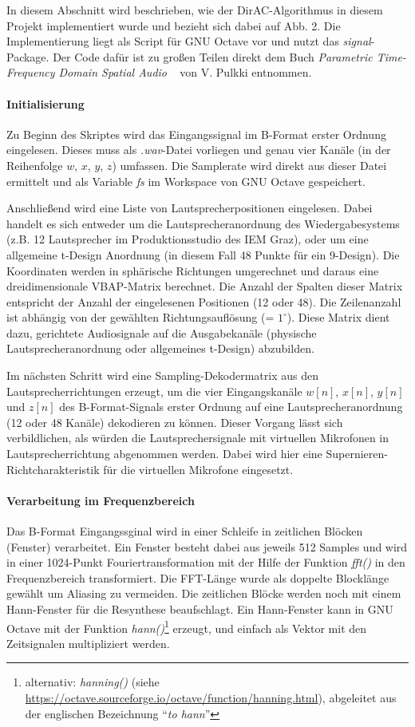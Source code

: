 In diesem Abschnitt wird beschrieben, wie der DirAC-Algorithmus in diesem Projekt implementiert wurde und bezieht sich dabei auf Abb. 2. Die Implementierung liegt als Script für GNU Octave vor und nutzt das \textit{signal}-Package. Der Code dafür ist zu großen Teilen direkt dem Buch \textit{Parametric Time-Frequency Domain Spatial Audio} ~\cite{spatial-book} von V. Pulkki entnommen.

\paragraph{Initialisierung}
Zu Beginn des Skriptes wird das Eingangssignal im B-Format erster Ordnung eingelesen. Dieses muss als \textit{.wav}-Datei vorliegen und genau vier Kanäle (in der Reihenfolge $w$, $x$, $y$, $z$) umfassen. Die Samplerate wird direkt aus dieser Datei ermittelt und als Variable \textit{fs} im Workspace von GNU Octave gespeichert.

Anschließend wird eine Liste von Lautsprecherpositionen eingelesen. Dabei handelt es sich entweder um die Lautsprecheranordnung des Wiedergabesystems (z.B. 12 Lautsprecher im Produktionsstudio des IEM Graz), oder um eine allgemeine t-Design Anordnung (in diesem Fall 48 Punkte für ein 9-Design). Die Koordinaten werden in sphärische Richtungen umgerechnet und daraus eine dreidimensionale VBAP-Matrix berechnet. Die Anzahl der Spalten dieser Matrix entspricht der Anzahl der eingelesenen Positionen (12 oder 48). Die Zeilenanzahl ist abhängig von der gewählten Richtungsauflösung (= $1^{\circ}$). Diese Matrix dient dazu, gerichtete Audiosignale auf die Ausgabekanäle (physische Lautsprecheranordnung oder allgemeines t-Design) abzubilden.

Im nächsten Schritt wird eine Sampling-Dekodermatrix \cite{ambi-book} aus den Lautsprecherrichtungen erzeugt, um die vier Eingangskanäle $w[n]$, $x[n]$, $y[n]$ und $z[n]$ des B-Format-Signals erster Ordnung auf eine Lautsprecheranordnung (12 oder 48 Kanäle) dekodieren zu können.
Dieser Vorgang lässt sich verbildlichen, als würden die Lautsprechersignale mit virtuellen Mikrofonen in Lautsprecherrichtung abgenommen werden. Dabei wird hier eine Supernieren-Richtcharakteristik für die virtuellen Mikrofone eingesetzt.

\paragraph{Verarbeitung im Frequenzbereich}
Das B-Format Eingangssginal wird in einer Schleife in zeitlichen Blöcken (Fenster) verarbeitet. Ein Fenster besteht dabei aus jeweils 512 Samples und wird in einer 1024-Punkt Fouriertransformation mit der Hilfe der Funktion \textit{fft()} in den Frequenzbereich transformiert. Die FFT-Länge wurde als doppelte Blocklänge gewählt um Aliasing zu vermeiden. Die zeitlichen Blöcke werden noch mit einem Hann-Fenster für die Resynthese beaufschlagt. Ein Hann-Fenster kann in GNU Octave mit der Funktion \textit{hann()}\footnote{alternativ: \textit{hanning()} (siehe \url{https://octave.sourceforge.io/octave/function/hanning.html}), abgeleitet aus der englischen Bezeichnung ``\textit{to hann}''} erzeugt, und einfach als Vektor mit den Zeitsignalen multipliziert werden.